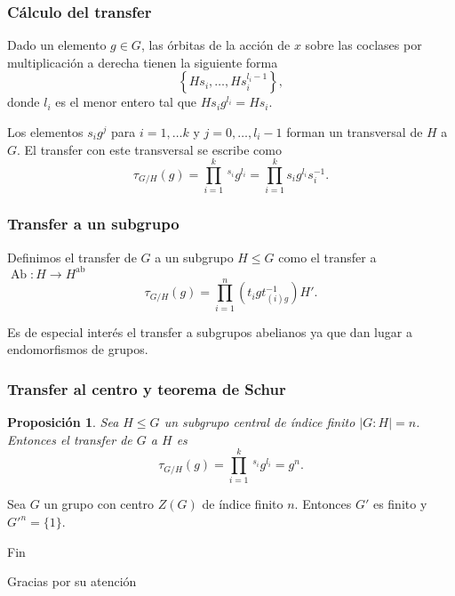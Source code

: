 \documentclass[
	11pt, %
]{beamer}
\DeclareMathOperator{\AbFunctor}{Ab}
\newcommand{\Ab}[1]{#1^\text{ab}}
\newcommand{\ord}[1]{\left|#1\right|}%
\newcommand{\homo}[3]{#1\colon #2\to #3}
\newcommand{\transfer}[2]{\tau_{#1/ #2}}
\newtheorem{proposition}{Proposici\'on}
\begin{document}
\begin{frame}
	\frametitle{Cálculo del transfer}
	Dado un elemento $g\in G$, las órbitas de la acción de $x$ sobre las coclases por multiplicación a derecha tienen la siguiente forma
	$$
		\left\{Hs_i,\ldots,Hs_i^{l_i-1}\right\},
	$$
	donde $l_i$ es el menor entero tal que $Hs_ig^{l_i} = Hs_i$.
	
	Los elementos $s_ig^j$ para $i=1,\ldots k$ y $j=0,\ldots,l_i-1$ forman un transversal de $H$ a $G$.
	\pause
	El transfer con este transversal se escribe como
	$$
		{\transfer G H}(g) = \prod_{i=1}^{k}\,^{s_i}g^{l_i} = \prod_{i=1}^{k}s_ig^{l_i}s_i^{-1}.
	$$
\end{frame}

\begin{frame}
	\frametitle{Transfer a un subgrupo}
	Definimos el transfer de $G$ a un subgrupo $H\leq G$ como el transfer a $\homo \AbFunctor H {\Ab H}$
	$$
		{\transfer G H}(g) = \prod_{i=1}^n \left(t_igt_{(i)g}^{-1}\right)H'.
	$$
	
	Es de especial interés el transfer a subgrupos abelianos ya que dan lugar a endomorfismos de grupos.
\end{frame}

\begin{frame}
	\frametitle{Transfer al centro y teorema de Schur}
	\begin{proposition}
		Sea $H\leq G$ un subgrupo central de índice finito $\ord{G:H} = n$. Entonces el transfer de $G$ a $H$ es
		$$
			{\transfer G H}(g) = \prod_{i=1}^k \,^{s_i}g^{l_i} = g^n.
		$$
	\end{proposition}
	\pause
	\begin{theorem}[Schur]
		Sea $G$ un grupo con centro $Z(G)$ de índice finito $n$. Entonces $G'$ es finito y $G'^n = \{1\}$.
	\end{theorem}
\end{frame}


\begin{frame}[plain] %
	\begin{center}
		{\Huge Fin}
		
		\bigskip\bigskip %
		
		{\LARGE Gracias por su atención}
	\end{center}
\end{frame}

\end{document}
